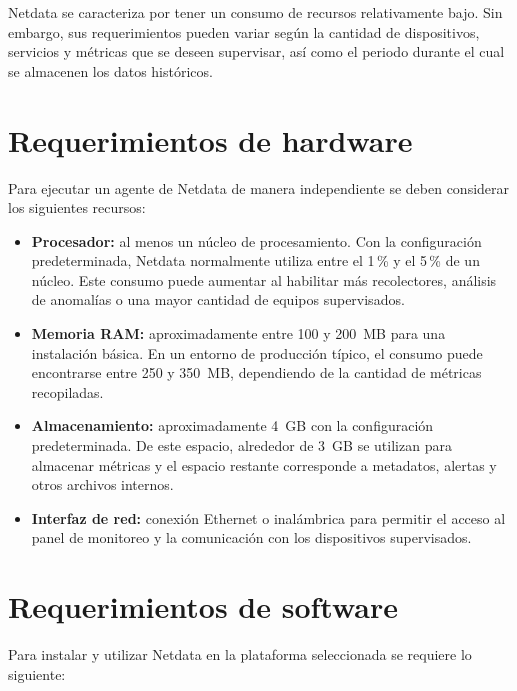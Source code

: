 
Netdata se caracteriza por tener un consumo de recursos relativamente bajo. Sin embargo, sus requerimientos pueden variar según la cantidad de dispositivos, servicios y métricas que se deseen supervisar, así como el periodo durante el cual se almacenen los datos históricos.

\section{Requerimientos de hardware}

Para ejecutar un agente de Netdata de manera independiente se deben considerar los siguientes recursos:

\begin{itemize}
    \item \textbf{Procesador:} al menos un núcleo de procesamiento. Con la configuración predeterminada, Netdata normalmente utiliza entre el 1\,\% y el 5\,\% de un núcleo. Este consumo puede aumentar al habilitar más recolectores, análisis de anomalías o una mayor cantidad de equipos supervisados.
    
    \item \textbf{Memoria RAM:} aproximadamente entre 100 y 200~MB para una instalación básica. En un entorno de producción típico, el consumo puede encontrarse entre 250 y 350~MB, dependiendo de la cantidad de métricas recopiladas.
    
    \item \textbf{Almacenamiento:} aproximadamente 4~GB con la configuración predeterminada. De este espacio, alrededor de 3~GB se utilizan para almacenar métricas y el espacio restante corresponde a metadatos, alertas y otros archivos internos.
    
    \item \textbf{Interfaz de red:} conexión Ethernet o inalámbrica para permitir el acceso al panel de monitoreo y la comunicación con los dispositivos supervisados. \cite{netdata-recursos} \cite{netdata-almacenamiento}
\end{itemize}

\section{Requerimientos de software}

Para instalar y utilizar Netdata en la plataforma seleccionada se requiere lo siguiente:

